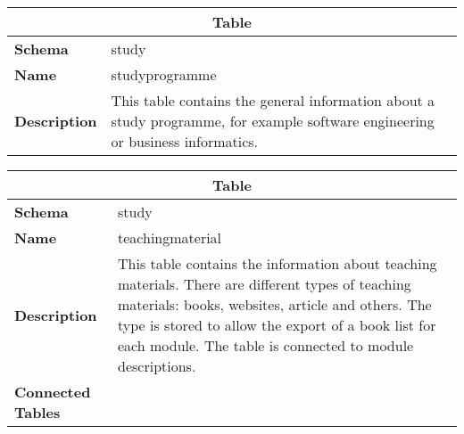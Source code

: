 \begin{table}[H]
	\label{table:studyprogramme}
	\centering
	\begin{tabular}{|p{}|p{}|}
		\hline
		\multicolumn{2}{|c|}{\textbf{Table}} \\ \hline
		\textbf{Schema}               & study \\ \hline
		\textbf{Name}                 & studyprogramme \\ \hline
		\textbf{Description}          & This table contains the general information about a study programme, for example software engineering or business informatics. \\ \hline
	\end{tabular}
\end{table}

\begin{table}[H]
	\label{table:teachingmaterial}
	\centering
	\begin{tabular}{|p{}|p{}|}
		\hline
		\multicolumn{2}{|c|}{\textbf{Table}} \\ \hline
		\textbf{Schema}               & study \\ \hline
		\textbf{Name}                 & teachingmaterial \\ \hline
		\textbf{Description}          & This table contains the information about teaching materials. There are different types of teaching materials: books, websites, article and others. The type is stored to allow the export of a book list for each module. The table is connected to module descriptions. \\ \hline
		\textbf{Connected Tables}     & \tableref{moduledescription} \\ \hline
	\end{tabular}
\end{table}